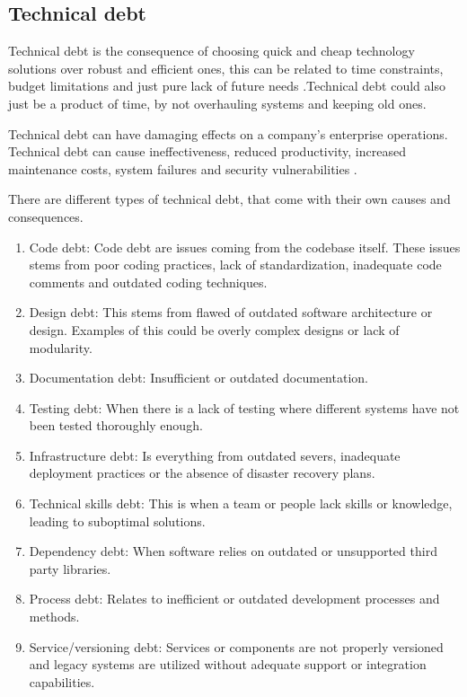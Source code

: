 \subsection{Technical debt}
Technical debt is the consequence of choosing quick and cheap technology solutions over robust and efficient ones, this can be related to time constraints, budget limitations and just pure lack of future needs \citep{TechinicalDebtOUTsystem}.Technical debt could also just be a product of time, by not overhauling systems and keeping old ones.

Technical debt can have damaging effects on a company's enterprise operations. Technical debt can cause ineffectiveness, reduced productivity, increased maintenance costs, system failures and security vulnerabilities \citep{TechinicalDebtOUTsystem}.

There are different types of technical debt, that come with their own causes and consequences.

\begin{enumerate}
	\item Code debt: Code debt are issues coming from the codebase itself.  These issues stems from poor coding practices, lack of standardization, inadequate code comments and outdated coding techniques.
	\item Design debt: This stems from flawed of outdated software architecture or design. Examples of this could be overly complex designs or lack of modularity.
	\item Documentation debt: Insufficient or outdated documentation.
	\item Testing debt: When there is a lack of testing where different systems have not been tested thoroughly enough.
	\item Infrastructure debt: Is everything from outdated severs, inadequate deployment practices or the absence of disaster recovery plans.
	\item Technical skills debt: This is when a team or people lack skills or knowledge, leading to suboptimal solutions.
	\item Dependency debt: When software relies on outdated or unsupported third party libraries.
	\item Process debt: Relates to inefficient or outdated development processes and methods.
	\item Service/versioning debt: Services or components are not properly versioned and legacy systems are utilized without adequate support or integration capabilities.
\end{enumerate}

